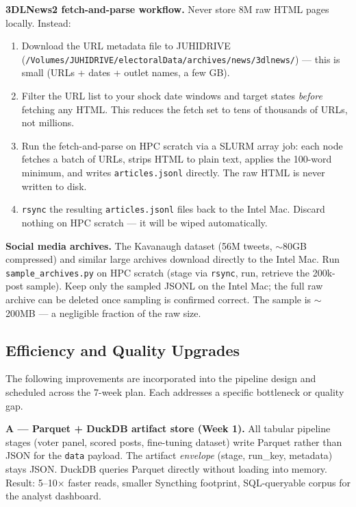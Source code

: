 \documentclass[11pt]{article}
\begin{document}
\medskip
\noindent\textbf{3DLNews2 fetch-and-parse workflow.} Never store 8M raw HTML pages
locally. Instead:
\begin{enumerate}[leftmargin=2em, itemsep=2pt]
  \item Download the URL metadata file to JUHIDRIVE
        (\texttt{/Volumes/JUHIDRIVE/electoralData/archives/news/3dlnews/}) --- this is small (URLs +
        dates + outlet names, a few GB).
  \item Filter the URL list to your shock date windows and target states
        \emph{before} fetching any HTML. This reduces the fetch set to tens
        of thousands of URLs, not millions.
  \item Run the fetch-and-parse on HPC scratch via a SLURM array job:
        each node fetches a batch of URLs, strips HTML to plain text, applies
        the 100-word minimum, and writes \texttt{articles.jsonl} directly.
        The raw HTML is never written to disk.
  \item \texttt{rsync} the resulting \texttt{articles.jsonl} files back to
        the Intel Mac. Discard nothing on HPC scratch --- it will be wiped
        automatically.
\end{enumerate}

\noindent\textbf{Social media archives.} The Kavanaugh dataset (56M tweets,
$\sim$80GB compressed) and similar large archives download directly to the Intel Mac.
Run \texttt{sample\_archives.py} on HPC scratch (stage via \texttt{rsync}, run,
retrieve the 200k-post sample). Keep only the sampled JSONL on the Intel Mac;
the full raw archive can be deleted once sampling is confirmed correct. The
sample is $\sim$200MB --- a negligible fraction of the raw size.

\subsection*{Efficiency and Quality Upgrades}

The following improvements are incorporated into the pipeline design and scheduled
across the 7-week plan. Each addresses a specific bottleneck or quality gap.

\textbf{A --- Parquet + DuckDB artifact store (Week 1).}
All tabular pipeline stages (voter panel, scored posts, fine-tuning dataset) write
Parquet rather than JSON for the \texttt{data} payload. The artifact \emph{envelope}
(stage, run\_key, metadata) stays JSON. DuckDB queries Parquet directly without
loading into memory. Result: 5--10$\times$ faster reads, smaller Syncthing footprint,
SQL-queryable corpus for the analyst dashboard.
\end{document}
